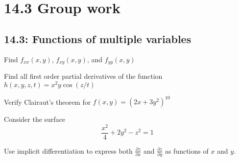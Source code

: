 \documentclass[12pt]{exam}
\newcommand{\qdate}{14.3 Group work } %
\begin{document}
\section*{\qdate}


\subsection*{14.3: Functions of multiple variables}

\begin{questions}

\question Find \(f_{xx}(x,y)\), \(f_{xy}(x,y)\), and \(f_{yy}(x,y)\)

    \question Find all first order partial derivatives of the function \(h(x,y,z,t)=x^2y\cos(z/t)\)
            \ifprintanswers
                \begin{solution}
                \end{solution}
            \else
                \vfill
            \fi

\newpage

    \question Verify Clairaut's theorem for \(f(x,y)=(2x+3y^2)^{10}\)
        \ifprintanswers
                \begin{solution}
                \end{solution}
            \else
                \vfill
            \fi

    \question Consider the surface 
    \[
        \frac{x^2}{4}+2y^2-z^2=1
    \]

    Use implicit differentiation to express both \(\frac{\partial z}{\partial x}\) and \(\frac{\partial z}{\partial y}\) as functions of \(x\) and \(y\).
    \ifprintanswers
                \begin{solution}
                \end{solution}
            \else
                \vfill
            \fi

\end{questions}
\end{document}
